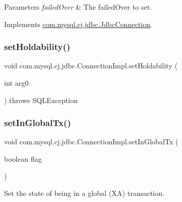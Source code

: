 \begin{DoxyParams}{Parameters}
{\em failed\+Over} & The failed\+Over to set. \\
\hline
\end{DoxyParams}


Implements \mbox{\hyperlink{interfacecom_1_1mysql_1_1cj_1_1jdbc_1_1_jdbc_connection_a65cb0cc5d2afc54002bfc16222bbe402}{com.\+mysql.\+cj.\+jdbc.\+Jdbc\+Connection}}.

\mbox{\label{classcom_1_1mysql_1_1cj_1_1jdbc_1_1_connection_impl_a8aa784925793e967a593b4c171a9f13b}} 
\subsubsection{\texorpdfstring{set\+Holdability()}{setHoldability()}}
{\footnotesize\ttfamily void com.\+mysql.\+cj.\+jdbc.\+Connection\+Impl.\+set\+Holdability (\begin{DoxyParamCaption}\item[{int}]{arg0 }\end{DoxyParamCaption}) throws S\+Q\+L\+Exception}

\mbox{\label{classcom_1_1mysql_1_1cj_1_1jdbc_1_1_connection_impl_a70a08ce7c0dea524a32a245986fb1531}} 
\subsubsection{\texorpdfstring{set\+In\+Global\+Tx()}{setInGlobalTx()}}
{\footnotesize\ttfamily void com.\+mysql.\+cj.\+jdbc.\+Connection\+Impl.\+set\+In\+Global\+Tx (\begin{DoxyParamCaption}\item[{boolean}]{flag }\end{DoxyParamCaption})}

Set the state of being in a global (XA) transaction.


